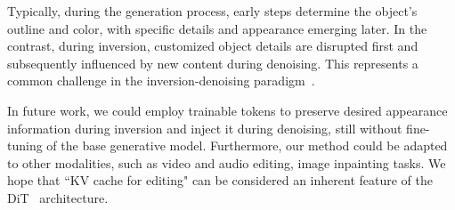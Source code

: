 Typically, during the generation process, early steps determine the object's outline and color, with specific details and appearance emerging later. In the contrast, during inversion, customized object details are disrupted first and subsequently influenced by new content during denoising. This represents a common challenge in the inversion-denoising paradigm~\cite{hertz2022prompt,tumanyan2023plug,dong2023prompt}.

In future work, we could employ trainable tokens to preserve desired appearance information during inversion and inject it during denoising, still without fine-tuning of the base generative model. Furthermore, our method could be adapted to other modalities, such as video and audio editing, image inpainting tasks. We hope that ``KV cache for editing" can be considered an inherent feature of the DiT~\cite{peebles2023scalable} architecture.
